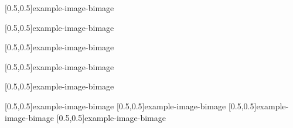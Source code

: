 



\graphicspath{{Figures/}{Figures/Iceland}}


\subtitle{Day 1}
\date{07.10.2019}


    
    
    [0.5,0.5]{example-image-b}{image}
    
    [0.5,0.5]{example-image-b}{image}
    
    [0.5,0.5]{example-image-b}{image}
    
    [0.5,0.5]{example-image-b}{image}
    
    
    [0.5,0.5]{example-image-b}{image}
    
    [0.5,0.5]{example-image-b}{image}
%     
    [0.5,0.5]{example-image-b}{image}
%     
    [0.5,0.5]{example-image-b}{image}
%     
    [0.5,0.5]{example-image-b}{image}


